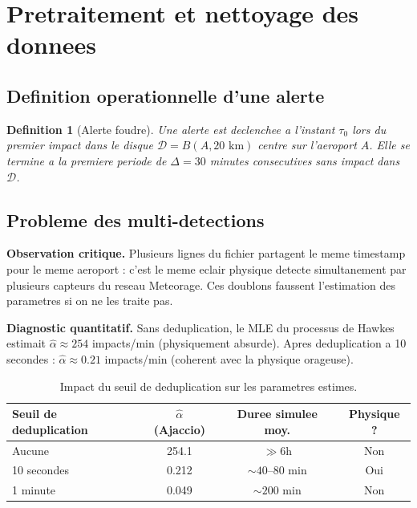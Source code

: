 \documentclass[a4paper,11pt]{article}
\newtheorem{definition}{Definition}[section]
\begin{document}
\section{Pretraitement et nettoyage des donnees}

\subsection{Definition operationnelle d'une alerte}

\begin{definition}[Alerte foudre]
Une alerte est declenchee a l'instant $\tau_0$ lors du premier impact dans le
disque $\mathcal{D} = B(A, 20\text{ km})$ centre sur l'aeroport $A$. Elle se
termine a la premiere periode de $\Delta = 30$ minutes consecutives sans impact
dans $\mathcal{D}$.
\end{definition}

\subsection{Probleme des multi-detections}

\textbf{Observation critique.} Plusieurs lignes du fichier partagent le meme
timestamp pour le meme aeroport : c'est le meme eclair physique detecte
simultanement par plusieurs capteurs du reseau Meteorage. Ces doublons
faussent l'estimation des parametres si on ne les traite pas.

\textbf{Diagnostic quantitatif.} Sans deduplication, le MLE du processus de
Hawkes estimait $\hat\alpha \approx 254$ impacts/min (physiquement absurde).
Apres deduplication a 10 secondes : $\hat\alpha \approx 0.21$ impacts/min
(coherent avec la physique orageuse).

\begin{table}[H]
\centering
\begin{tabular}{lccc}
\toprule
Seuil de deduplication & $\hat\alpha$ (Ajaccio) & Duree simulee moy. & Physique ? \\
\midrule
Aucune & 254.1 & $\gg 6$h & Non \\
10 secondes & 0.212 & $\sim 40$--80 min & Oui \\
1 minute & 0.049 & $\sim 200$ min & Non \\
\bottomrule
\end{tabular}
\caption{Impact du seuil de deduplication sur les parametres estimes.}
\end{table}
\end{document}
